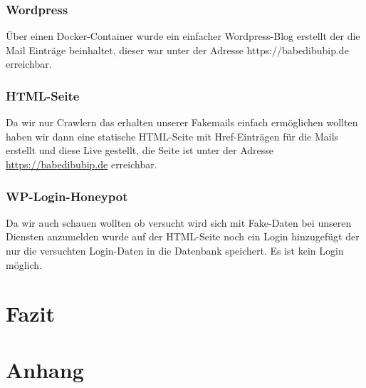 \documentclass[a4paper,11pt,singlespacing]{article}
\begin{document}
		\subsubsection{Wordpress}\label{WebsiteWordpress}
			Über einen Docker-Container wurde ein einfacher Wordpress-Blog erstellt der die Mail Einträge beinhaltet, dieser war unter der Adresse https://babedibubip.de erreichbar.
			
		\subsubsection{HTML-Seite}\label{WebsiteHTML-Seite}
			Da wir nur Crawlern das erhalten unserer Fakemails einfach ermöglichen wollten haben wir dann eine statische HTML-Seite mit Href-Einträgen für die Mails erstellt und diese Live gestellt, die Seite ist unter der Adresse \url{https://babedibubip.de} erreichbar.

		\subsubsection{WP-Login-Honeypot}\label{WebsiteWP-Login-Honeypot}
			Da wir auch schauen wollten ob versucht wird sich mit Fake-Daten bei unseren Diensten anzumelden wurde auf der HTML-Seite noch ein Login hinzugefügt der nur die versuchten Login-Daten in die Datenbank speichert. Es ist kein Login möglich.
	
\section{Fazit}\label{sec:Fazit}


\newpage




\newpage
\listoffigures
{}


\newpage
\lstlistoflistings
{}
	
	
%
\section*{Anhang}\label{Anhang}
%
	
\end{document}
